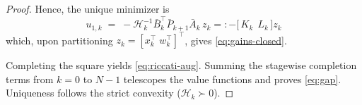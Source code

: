 \documentclass[letterpaper, 10 pt, conference]{ieeeconf}  %
\begin{document}
\begin{proof}
Hence, the unique minimizer is
\begin{equation}\label{eq:ukstar}
u_{1,k} \;=\; -\mathcal H_k^{-1}\bar B_k^\top \bar P_{k+1}\bar A_k\, z_k =:-\big[\,K_k\ \ L_k\,\big] z_k
\end{equation}
which, upon partitioning $z_k=[x_k^\top \; w_k^\top]^\top$, gives \eqref{eq:gains-closed}. 

Completing the square yields \eqref{eq:riccati-aug}. Summing the stagewise completion terms from $k=0$ to $N-1$ telescopes the value functions and proves \eqref{eq:gap}. Uniqueness follows the strict convexity ($\mathcal H_k\succ 0$).
\end{proof}


\end{document}
